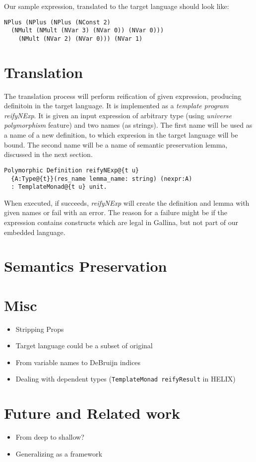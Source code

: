 \documentclass[sigplan]{acmart}\settopmatter{printfolios=true,printccs=false,printacmref=false}
\begin{document}
Our sample expression, translated to the target language should look
like:

\begin{lstlisting}[language=Coq, mathescape=true,
  frame=single, basicstyle=\footnotesize]
NPlus (NPlus (NPlus (NConst 2)
  (NMult (NMult (NVar 3) (NVar 0)) (NVar 0)))
    (NMult (NVar 2) (NVar 0))) (NVar 1)
\end{lstlisting}
   
\section{Translation}

The translation process will perform reification of given expression,
producing definitoin in the target language. It is implemented as a
\textit{template program} \emph{reifyNExp}. It is given an input
expression of arbitrary type (using \textit{universe polymorphism}
feature) and two names (as strings). The first name will be used as a
name of a new definition, to which expresion in the target language
will be bound. The second name will be a name of semantic preservation
lemma, discussed in the next section.

\begin{lstlisting}[language=Coq, mathescape=true,
  frame=single, basicstyle=\footnotesize]
Polymorphic Definition reifyNExp@{t u}
  {A:Type@{t}}(res_name lemma_name: string) (nexpr:A)
  : TemplateMonad@{t u} unit.
\end{lstlisting}

When executed, if succeeds, \emph{reifyNExp} will create the
definition and lemma with given names or fail with an error.  The
reason for a failure might be if the expression contains constructs
which are legal in Gallina, but not part of our embedded language.

\section{Semantics Preservation}


\section{Misc}
\begin{itemize}
\item Stripping Props
\item Target language could be a subset of original
\item From variable names to DeBruijn indices
\item Dealing with dependent types (\verb|TemplateMonad reifyResult| in HELIX)
\end{itemize}

\section{Future and Related work}
\begin{itemize}
\item From deep to shallow?
\item Generalizing as a framework
\end{itemize}

%




\nocite{*}


\end{document}
